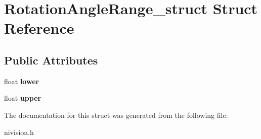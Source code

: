 \hypertarget{structRotationAngleRange__struct}{
\section{RotationAngleRange\_\-struct Struct Reference}
\label{structRotationAngleRange__struct}
}
\subsection*{Public Attributes}
\begin{DoxyCompactItemize}
\item 
\hypertarget{structRotationAngleRange__struct_aca3043e5da20912d427b09cd2474275a}{
float {\bfseries lower}}
\label{structRotationAngleRange__struct_aca3043e5da20912d427b09cd2474275a}

\item 
\hypertarget{structRotationAngleRange__struct_ab773a7484f202f521c507128f207e2a3}{
float {\bfseries upper}}
\label{structRotationAngleRange__struct_ab773a7484f202f521c507128f207e2a3}

\end{DoxyCompactItemize}


The documentation for this struct was generated from the following file:\begin{DoxyCompactItemize}
\item 
nivision.h\end{DoxyCompactItemize}
